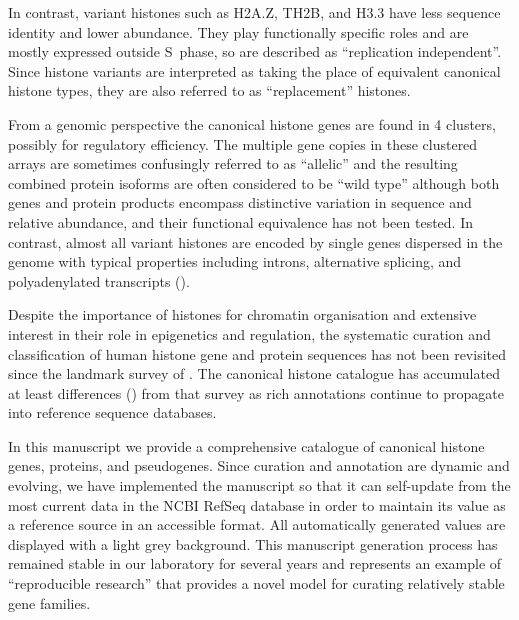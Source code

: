   In contrast, variant histones such as H2A.Z, TH2B, and H3.3 have
  less sequence identity and lower abundance.
  They play functionally specific roles and are mostly expressed outside S~phase,
  so are described as ``replication independent''.
  Since histone variants are interpreted as taking the place
  of equivalent canonical histone types,
  they are also referred to as ``replacement'' histones.

  From a genomic perspective the canonical histone genes are found in 4 clusters,
  possibly for regulatory efficiency.
  The multiple gene copies in these clustered arrays are sometimes confusingly referred to as ``allelic''
  and the resulting combined protein isoforms are often considered to be ``wild type''
  although both genes and protein products encompass distinctive
  variation in sequence and relative abundance,
  and their functional equivalence has not been tested.
  In contrast, almost all variant histones are encoded by single genes dispersed in the genome
  with typical properties including introns, alternative splicing,
  and polyadenylated transcripts ().

  Despite the importance of histones for chromatin organisation and extensive interest
  in their role in epigenetics and regulation, the systematic
  curation and classification of human histone
  gene and protein sequences has not been revisited
  since the landmark survey of \citet{Marzluff02}.
  The canonical histone catalogue has accumulated at least
   differences ()
  from that survey as rich annotations continue to propagate into reference sequence databases.

  In this manuscript we provide a comprehensive catalogue
  of canonical histone genes, proteins, and pseudogenes.
  Since curation and annotation are dynamic and evolving,
  we have implemented the manuscript so that it can
  self-update from the most current data in the NCBI RefSeq database
  in order to maintain its value as a reference source in an accessible format.
  All automatically generated values are displayed with a light grey background.
  This manuscript generation process has remained stable in our laboratory for several years
  and represents an example of ``reproducible research'' \citep{Claerbout2000}
  that provides a novel model for curating relatively stable gene families.

